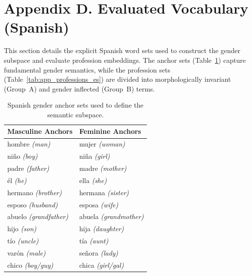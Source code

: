 \documentclass[english, a4paper, 11.5pt, twoside]{article}
\begin{document}
\newpage

\section*{Appendix D. Evaluated Vocabulary (Spanish)}

This section details the explicit Spanish word sets used to construct the gender subspace and evaluate profession embeddings. The anchor sets (Table~\ref{tab:app_anchors_es}) capture fundamental gender semantics, while the profession sets (Table~\ref{tab:app_professions_es}) are divided into morphologically invariant (Group~A) and gender inflected (Group~B) terms.

\hspace{4em}

\begin{table}[!htbp]
\centering
\caption{Spanish gender anchor sets used to define the semantic subspace.}
\label{tab:app_anchors_es}
\small
\begin{tabular}{ll}
\toprule
\textbf{Masculine Anchors} & \textbf{Feminine Anchors} \\
\midrule
hombre \textit{(man)} & mujer \textit{(woman)} \\
niño \textit{(boy)} & niña \textit{(girl)} \\
padre \textit{(father)} & madre \textit{(mother)} \\
él \textit{(he)} & ella \textit{(she)} \\
hermano \textit{(brother)} & hermana \textit{(sister)} \\
esposo \textit{(husband)} & esposa \textit{(wife)} \\
abuelo \textit{(grandfather)} & abuela \textit{(grandmother)} \\
hijo \textit{(son)} & hija \textit{(daughter)} \\
tío \textit{(uncle)} & tía \textit{(aunt)} \\
varón \textit{(male)} & señora \textit{(lady)} \\
chico \textit{(boy/guy)} & chica \textit{(girl/gal)} \\
\bottomrule
\end{tabular}
\end{table}

\hspace{2em}
\end{document}
